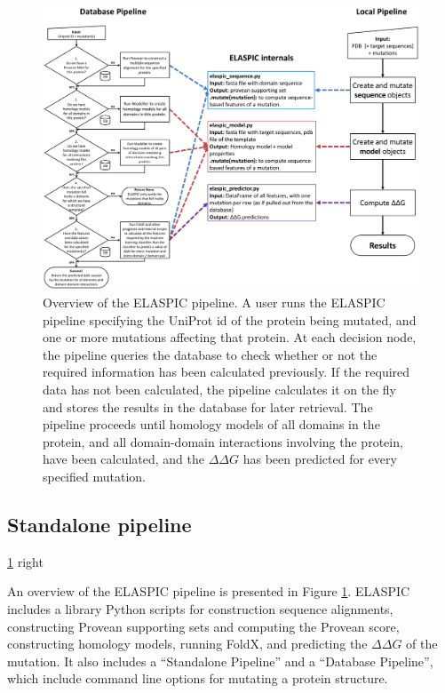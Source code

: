 \begin{figure}[ht]
	\centering
	\includegraphics[width=1.0\textwidth]{static/elaspic/elaspic_flowchart.pdf}
	\caption[Overview of the ELASPIC pipeline]{Overview of the ELASPIC pipeline. A user runs the ELASPIC pipeline specifying the UniProt id of the protein being mutated, and one or more mutations affecting that protein. At each decision node, the pipeline queries the database to check whether or not the required information has been calculated previously. If the required data has not been calculated, the pipeline calculates it on the fly and stores the results in the database for later retrieval. The pipeline proceeds until homology models of all domains in the protein, and all domain-domain interactions involving the protein, have been calculated, and the $\Delta \Delta G$ has been predicted for every specified mutation.}
	\label{fig:elaspic_pipeline}
\end{figure}


\subsection{Standalone pipeline}

\ref{fig:elaspic_pipeline} right

An overview of the ELASPIC pipeline is presented in Figure \ref{fig:elaspic_pipeline}. ELASPIC includes a library Python scripts for construction sequence alignments, constructing Provean supporting sets and computing the Provean score, constructing homology models, running FoldX, and predicting the $\Delta \Delta G$ of the mutation. It also includes a ``Standalone Pipeline'' and a ``Database Pipeline'', which include command line options for mutating a protein structure.


